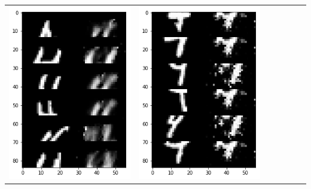 \documentclass[12pt]{report} %
\begin{document}
\begin{tabular}{m{0.7cm}m{2.4cm}m{2.4cm}m{2.4cm}m{2.4cm}m{2.4cm}m{2.4cm}}
	\includegraphics[scale=0.3]{pictures/M1_4_up.png} & \includegraphics[scale=0.3]{pictures/M1_4_down.png} &

\end{tabular}
\end{document}
